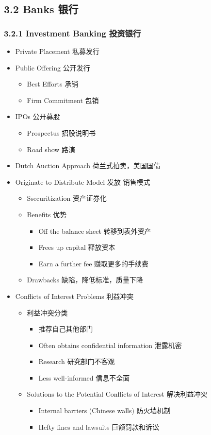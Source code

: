 \documentclass[a4paper,6pt,twoside,openany]{article}
\begin{document}
\subsection*{3.2 Banks 银行}
\subsubsection*{3.2.1 Investment Banking 投资银行}
\begin{itemize}
\item Private Placement 私募发行
\item Public Offering 公开发行
  \begin{itemize}
  \item Best Efforts 承销
  \item Firm Commitment 包销
  \end{itemize}
\item IPOs 公开募股
  \begin{itemize}
  \item Prospectus 招股说明书
  \item Road show 路演
  \end{itemize}
\item Dutch Auction Approach 荷兰式拍卖，美国国债
\item Originate-to-Distribute Model 发放-销售模式
  \begin{itemize}
  \item Ssecuritization 资产证券化
  \item Benefits 优势
    \begin{itemize}
    \item Off the balance sheet 转移到表外资产
    \item Frees up capital 释放资本
    \item Earn a further fee 赚取更多的手续费
    \end{itemize}
  \item Drawbacks 缺陷，降低标准，质量下降
  \end{itemize}
\item Conflicts of Interest Problems 利益冲突
  \begin{itemize}
  \item 利益冲突分类
    \begin{itemize}
        \item 推荐自己其他部门
  \item Often obtains confidential information 泄露机密
  \item Research 研究部门不客观
  \item Less well-informed 信息不全面
    \end{itemize}
  \item Solutions to the Potential Conflicts of Interest 解决利益冲突
    \begin{itemize}
        \item Internal barriers (Chinese walls) 防火墙机制
        \item Hefty fines and lawsuits 巨额罚款和诉讼
    \end{itemize}
  \end{itemize}
\end{itemize}
\end{document}
